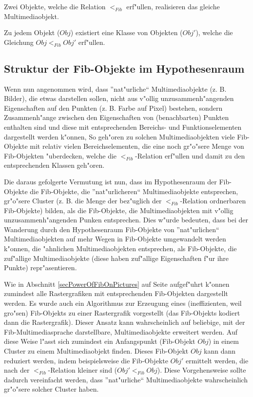 Zwei Objekte, welche die Relation $<_{Fib}$ erf"ullen, realisieren das gleiche Multimediaobjekt.

\bigskip\noindent
Zu jedem Objekt ($Obj$) existiert eine Klasse von Objekten ($Obj'$), welche die Gleichung $Obj <_{Fib} Obj'$ erf"ullen.


\subsection{Struktur der Fib-Objekte im Hypothesenraum}

Wenn nun angenommen wird, dass ''nat"urliche`` Multimediaobjekte (z. B. Bilder), die etwas darstellen sollen, nicht aus v"ollig unzusammenh"angenden Eigenschaften auf den Punkten (z. B. Farbe auf Pixel) bestehen, sondern Zusammenh"ange zwischen den Eigenschaften von (benachbarten) Punkten enthalten sind und diese mit entsprechenden Bereichs- und Funktionselementen dargestellt werden k"onnen, So geh"oren zu solchen Multimediaobjekten viele Fib-Objekte mit relativ vielen Bereichselementen, die eine noch gr"o"sere Menge von Fib-Objekten "uberdecken, welche die $<_{Fib}$-Relation erf"ullen und damit zu den entsprechenden Klassen geh"oren.

Die daraus gefolgerte Vermutung ist nun, dass im Hypothesenraum der Fib-Objekte die Fib-Objekte, die ''nat"urlicheren`` Multimediaobjekte entsprechen, gr"o"sere Cluster (z. B. die Menge der bez"uglich der $<_{Fib}$-Relation ordnerbaren Fib-Objekte) bilden, als die Fib-Objekte, die Multimediaobjekten mit v"ollig unzusammenh"angenden Punken entsprechen.
Dies w"urde bedeuten, dass bei der Wanderung durch den Hypothesenraum Fib-Objekte von ''nat"urlichen`` Multimediaobjekten auf mehr Wegen in Fib-Objekte umgewandelt werden k"onnen, die "ahnlichen Multimediaobjekten entsprechen, als Fib-Objekte, die zuf"allige Multimediaobjekte (diese haben zuf"allige Eigenschaften f"ur ihre Punkte) repr"asentieren.

Wie in Abschnitt \ref{secPowerOfFibOnPictures} auf Seite \pageref{secPowerOfFibOnPictures} aufgef"uhrt k"onnen zumindest alle Rastergrafiken mit entsprechenden Fib-Objekten dargestellt werden. Es wurde auch ein Algorithmus zur Erzeugung eines (ineffizienten, weil gro"sen) Fib-Objekts zu einer Rastergrafik vorgestellt (das Fib-Objekts kodiert dann die Rastergrafik). Dieser Ansatz kann wahrscheinlich auf beliebige, mit der Fib-Multimediasprache darstellbare, Multimediaobjekte erweitert werden. Auf diese Weise l"asst sich zumindest ein Anfangspunkt (Fib-Objekt $Obj$) in einem Cluster zu einem Multimediaobjekt finden. Dieses Fib-Objekt $Obj$ kann dann reduziert werden, indem beispielsweise die Fib-Objekte $Obj'$ ermittelt werden, die nach der $<_{Fib}$-Relation kleiner sind ($Obj' <_{Fib} Obj$). Diese Vorgehensweise sollte dadurch vereinfacht werden, dass ''nat"urliche`` Multimediaobjekte wahrscheinlich gr"o"sere solcher Cluster haben.

